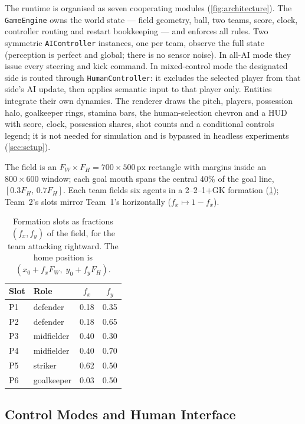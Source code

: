 \documentclass[10pt,twocolumn]{article}
\newcommand{\px}{\ensuremath{\,\mathrm{px}}}
\newcommand{\code}[1]{\texttt{#1}}
\begin{document}
The runtime is organised as seven cooperating modules
(\cref{fig:architecture}). The
\code{GameEngine} owns the world state --- field geometry, ball, two teams,
score, clock, controller routing and restart bookkeeping --- and enforces all
rules. Two symmetric \code{AIController} instances, one per team, observe the
full state (perception is perfect and global; there is no sensor noise). In
all-AI mode they issue every steering and kick command. In mixed-control mode
the designated side is routed through \code{HumanController}: it excludes the
selected player from that side's AI update, then applies semantic input to
that player only. Entities integrate their own dynamics. The renderer draws
the pitch, players, possession halo, goalkeeper rings, stamina bars, the
human-selection chevron and a HUD with score, clock, possession shares, shot
counts and a conditional controls legend; it is not needed for simulation
and is bypassed in headless experiments (\cref{sec:setup}).

The field is an $F_W \times F_H = 700 \times 500\px$ rectangle with margins
inside an $800\times600$ window; each goal mouth spans the central 40\% of
the goal line, $[0.3F_H,\,0.7F_H]$. Each team fields six agents in a
2--2--1+GK formation (\cref{tab:formation}); Team~2's slots mirror Team~1's
horizontally ($f_x \mapsto 1-f_x$).

\begin{table}[t]
\centering\small
\caption{Formation slots as fractions $(f_x,f_y)$ of the field, for the
team attacking rightward. The home position is
$(x_0 + f_x F_W,\; y_0 + f_y F_H)$.}
\label{tab:formation}
\begin{tabular}{@{}llcc@{}}
\toprule
Slot & Role & $f_x$ & $f_y$ \\
\midrule
P1 & defender    & 0.18 & 0.35 \\
P2 & defender    & 0.18 & 0.65 \\
P3 & midfielder  & 0.40 & 0.30 \\
P4 & midfielder  & 0.40 & 0.70 \\
P5 & striker     & 0.62 & 0.50 \\
P6 & goalkeeper  & 0.03 & 0.50 \\
\bottomrule
\end{tabular}
\end{table}

\subsection{Control Modes and Human Interface}\label{sec:human}
\end{document}

